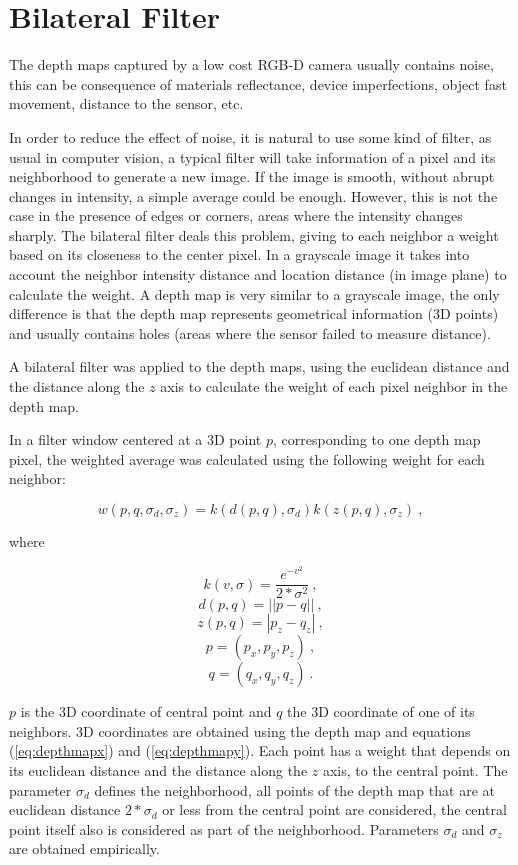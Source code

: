 \section{Bilateral Filter}


The depth maps captured by a low cost RGB-D camera usually contains noise, this can be 
consequence of materials reflectance, device imperfections, object fast movement, distance to the 
sensor, etc. 

In order to reduce the effect of noise, it is natural to use some kind of filter, as usual in computer 
vision, a typical filter will take information of a pixel and its neighborhood to generate a new image. 
If the image is smooth, without abrupt changes in intensity, a simple average could be enough. However, this 
is not the case in the presence of edges or corners, areas where the intensity changes sharply. 
The bilateral filter deals this problem, giving to each neighbor a weight based on its closeness  
to the center pixel. In a grayscale image it takes into account 
the neighbor intensity distance and location distance (in image plane) to calculate the weight.  A depth map is very similar to a grayscale 
image, the only difference is that the depth map represents geometrical information (3D points) and usually contains holes 
(areas where the sensor failed to measure distance). 

A bilateral filter was applied to the depth maps, using the euclidean distance and the distance along the $z$ axis to calculate 
the weight of each pixel neighbor in the depth map. 

In a filter window centered at a 3D point $p$, corresponding to one depth map pixel, 
the weighted average was calculated using the following weight for each neighbor:


$$ w(p,q,\sigma_d,\sigma_z) = k(d(p,q),\sigma_d) k(z(p,q),\sigma_z)\ , $$

\noindent where 

$$ k(v,\sigma) = \frac{e^{-v^2}}{2*\sigma^2}\ , $$
$$ d(p,q) = ||p - q||\ , $$
$$ z(p,q) = |p_z - q_z|\ , $$
$$ p = (p_x,p_y,p_z)\ , $$ 
$$ q = (q_x,q_y,q_z)\ . $$

\noindent $p$ is the 3D coordinate of central point and $q$ the 3D coordinate of one of its neighbors. 3D coordinates are obtained using
 the depth map and equations (\ref{eq:depthmapx}) and (\ref{eq:depthmapy}).  Each point has a weight that depends on its euclidean distance and
 the distance along the $z$ axis, to the central point. The parameter $\sigma_d$ defines 
the neighborhood, all points of the depth map that are at euclidean distance $2*\sigma_d$ or less from the central point are considered, the 
central point itself also is considered as part of the neighborhood. Parameters $\sigma_d$ and $\sigma_z$ are obtained empirically.


